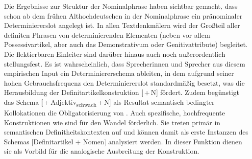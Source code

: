 Die Ergebnisse zur Struktur der Nominalphrase haben sichtbar gemacht, dass schon ab dem frühen Althochdeutschen in der Nominalphrase ein pränominaler Determiniererslot angelegt ist. In allen Textdenkmälern wird der Großteil aller definiten Phrasen von determinierenden Elementen (neben  vor allem Possessivartikel, aber auch das Demonstrativum  oder Genitivattribute) begleitet. Die flektierbaren Einleiter sind darüber hinaus auch noch außerordentlich stellungsfest. Es ist wahrscheinlich, dass Sprecherinnen und Sprecher aus diesem empirischen Input ein Determiniererschema ableiten, in dem  aufgrund seiner hohen Gebrauchsfrequenz den Determiniererslot standardmäßig besetzt, was die Herausbildung der Definitartikelkonstruktion [\,+\,N] fördert. Zudem begünstigt das Schema [\,+\,Adjektiv\textsubscript{schwach}\,+\,N] als Resultat semantisch bedingter Kollokationen die Obligatorisierung von . Auch spezifische, hochfrequente Konstruktionen wie  sind für den Wandel förderlich. Sie treten primär in semantischen Definitheitskontexten auf und können damit als erste Instanzen des Schemas [Definitartikel + Nomen] analysiert werden. In dieser Funktion dienen sie als Vorbild für die analogische Ausbreitung der Konstruktion. 






